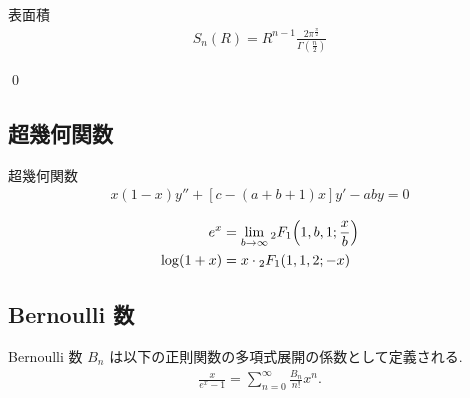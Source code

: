 \documentclass[uplatex,dvipdfmx,a4paper,11pt]{jlreq}
\makeatletter
\theoremstyle{definition}
\renewenvironment{proof}[1][\proofname]{\par
  \normalfont
  \topsep6\p@\@plus6\p@ \trivlist
  \item[\hskip\labelsep{\bfseries #1}\@addpunct{\bfseries}]\ignorespaces\quad\par
}{%
  \qed\endtrivlist\@endpefalse
}
\renewcommand\proofname{証明}
\makeatother
\begin{document}
\begin{theorem}
  表面積
  \begin{align}
    S_n(R) = R^{n-1}\frac{2\pi^{\frac{\pi}{2}}}{\Gamma(\frac{n}{2})}
  \end{align}
\end{theorem}
\begin{proof}

\end{proof}

\begin{proposition}

\end{proposition}

\subsection{超幾何関数}
\begin{definition}
  超幾何関数
  \begin{align}
    x(1 - x)y'' + [c - (a + b + 1)x]y' - aby = 0
  \end{align}
\end{definition}
\begin{proposition}
  \begin{align}
    e^x         & = \lim_{b\to\infty}{}_2F_1\qty(1,b,1;\frac{x}{b}) \\
    \log(1 + x) & = x\cdot{}_2F_1(1,1,2;-x)
  \end{align}
\end{proposition}

\subsection{Bernoulli 数}
\begin{definition}[Bernoulli 数]
  Bernoulli 数 $B_n$ は以下の正則関数の多項式展開の係数として定義される.
  \begin{align}
    \frac{x}{e^x - 1} = \sum_{n=0}^{\infty}\frac{B_n}{n!}x^n.
  \end{align}
\end{definition}
\end{document}
